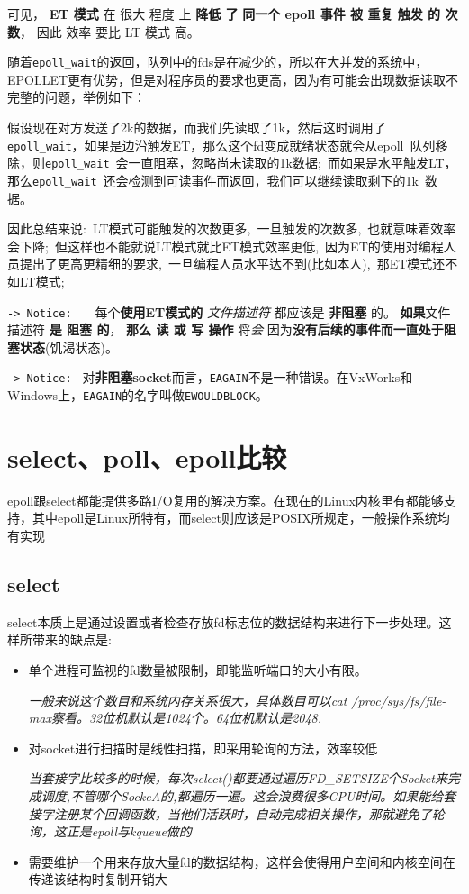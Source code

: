 \documentclass[UTF8,a4paper,8pt]{ctexbook}
\begin{document}
				可见， \textbf{ET 模式} 在 很大 程度 上 \textbf{降低 了} \textbf{同一个 epoll 事件 被 重复 触发 的 次数}， 因此 效率 要比 LT 模式 高。
				
				随着\verb|epoll_wait|的返回，队列中的fds是在减少的，所以在大并发的系统中，EPOLLET更有优势，但是对程序员的要求也更高，因为有可能会出现数据读取不完整的问题，举例如下：
				
				假设现在对方发送了2k的数据，而我们先读取了1k，然后这时调用了\verb|epoll_wait|，如果是边沿触发ET，那么这个fd变成就绪状态就会从epoll 队列移除，则\verb|epoll_wait| 会一直阻塞，忽略尚未读取的1k数据; 而如果是水平触发LT，那么\verb|epoll_wait| 还会检测到可读事件而返回，我们可以继续读取剩下的1k 数据。
				
				因此总结来说: LT模式可能触发的次数更多, 一旦触发的次数多, 也就意味着效率会下降; 但这样也不能就说LT模式就比ET模式效率更低, 因为ET的使用对编程人员提出了更高更精细的要求, 一旦编程人员水平达不到(比如本人), 那ET模式还不如LT模式;
				
				\verb|-> Notice: |　 每个\textbf{使用ET模式的} \textit{文件描述符} 都应该是 \textbf{非阻塞} 的。 \textbf{如果}文件描述符 \textbf{是 阻塞 的}， \textbf{那么 读 或 写 操作} 将\textit{会} 因为\textbf{没有后续的事件而一直处于阻塞状态}(饥渴状态)。
				
				\verb|-> Notice: | 对\textbf{非阻塞socket}而言，\verb|EAGAIN|不是一种错误。在VxWorks和Windows上，\verb|EAGAIN|的名字叫做\verb|EWOULDBLOCK|。
	\section{select、poll、epoll比较}
		epoll跟select都能提供多路I/O复用的解决方案。在现在的Linux内核里有都能够支持，其中epoll是Linux所特有，而select则应该是POSIX所规定，一般操作系统均有实现
		                               
		\subsection{select}             
			select本质上是通过设置或者检查存放fd标志位的数据结构来进行下一步处理。这样所带来的缺点是:
			\begin{itemize}                   
				\item 单个进程可监视的fd数量被限制，即能监听端口的大小有限。 
				
				\textit{一般来说这个数目和系统内存关系很大，具体数目可以cat /proc/sys/fs/file-max察看。32位机默认是1024个。64位机默认是2048.}
				
				\item 对socket进行扫描时是线性扫描，即采用轮询的方法，效率较低
				
				\textit{当套接字比较多的时候，每次select()都要通过遍历FD\_SETSIZE个Socket来完成调度,不管哪个SockeA的,都遍历一遍。这会浪费很多CPU时间。如果能给套接字注册某个回调函数，当他们活跃时，自动完成相关操作，那就避免了轮询，这正是epoll与kqueue做的}
				\item 需要维护一个用来存放大量fd的数据结构，这样会使得用户空间和内核空间在传递该结构时复制开销大
			\end{itemize}
		
\end{document}
